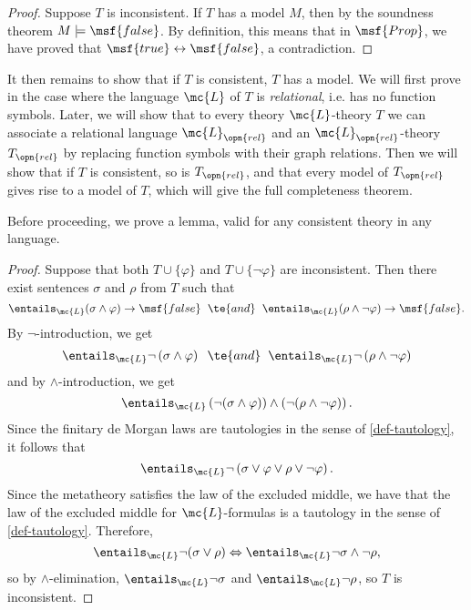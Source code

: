 \documentclass[11pt]{article}
\newcommand{\true}{\msf{true}}
\newcommand{\false}{\msf{false}}
\begin{document}
\begin{proof}
Suppose $T$ is inconsistent. If $T$ has a model $M$, then by the soundness theorem $M \models \false$. By definition, this means that in $\msf{Prop}$, we have proved that $\true \leftrightarrow \false$, a contradiction.
\end{proof}

It then remains to show that if $T$ is consistent, $T$ has a model. We will first prove  in the case where the language $\mc{L}$ of $T$ is \emph{relational}, i.e. has no function symbols. Later, we will show that to every theory $\mc{L}$-theory $T$ we can associate a relational language $\mc{L}_{\opn{rel}}$ and an $\mc{L}_{\opn{rel}}$-theory $T_{\opn{rel}}$ by replacing function symbols with their graph relations. Then we will show that if $T$ is consistent, so is $T_{\opn{rel}}$, and that every model of $T_{\opn{rel}}$ gives rise to a model of $T$, which will give the full completeness theorem.

Before proceeding, we prove a lemma, valid for any consistent theory in any language.


\begin{proof}
  Suppose that both $T \cup \{\varphi\}$ and $T \cup \{ \neg \varphi\}$ are inconsistent. Then there exist sentences $\sigma$ and $\rho$ from $T$ such that
  $$
\entails_{\mc{L}} (\sigma \wedge \varphi) \to \false \hspace{2mm} \te{ and } \hspace{2mm} \entails_{\mc{L}} (\rho \wedge \neg \varphi) \to \false.
$$
By $\neg$-introduction, we get
$$
\entails_{\mc{L}} \neg \left(\sigma \wedge \varphi\right) \hspace{2mm} \te{ and } \hspace{2mm} \entails_{\mc{L}} \neg \left(\rho \wedge \neg \varphi\right)
$$
and by $\wedge$-introduction, we get
$$
\entails_{\mc{L}} \left(\neg(\sigma \wedge \varphi) \right) \wedge \left(\neg (\rho \wedge \neg \varphi) \right).
$$
Since the finitary de Morgan laws are tautologies in the sense of \ref{def-tautology}, it follows that
$$
\entails_{\mc{L}} \neg \left(\sigma \lor \varphi \lor \rho \lor \neg \varphi\right).
$$
Since the metatheory satisfies the law of the excluded middle, we have that the law of the excluded middle for $\mc{L}$-formulas is a tautology in the sense of \ref{def-tautology}. Therefore,
$$
\entails_{\mc{L}} \neg(\sigma \lor \rho) \Leftrightarrow \entails_{\mc{L}} \neg \sigma \land \neg \rho,
$$
so by $\wedge$-elimination,
$\entails_{\mc{L}} \neg \sigma$ and $\entails_{\mc{L}} \neg \rho$, so $T$ is inconsistent.
\end{proof}
\end{document}
